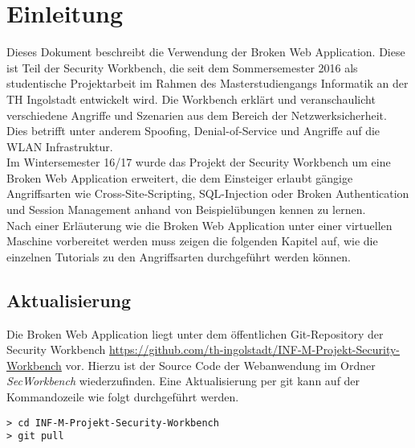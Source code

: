 \chapter{Einleitung}
Dieses Dokument beschreibt die Verwendung der Broken Web Application. Diese ist Teil der Security Workbench, die seit
dem Sommersemester 2016 als studentische Projektarbeit im Rahmen des Masterstudiengangs
Informatik an der TH Ingolstadt entwickelt wird. Die Workbench
erklärt und veranschaulicht verschiedene Angriffe und Szenarien aus dem Bereich
der Netzwerksicherheit. Dies betrifft unter anderem Spoofing, Denial-of-Service
und Angriffe auf die WLAN Infrastruktur. \\ 
Im Wintersemester 16/17 wurde das Projekt der Security Workbench um eine Broken Web Application erweitert, die dem Einsteiger erlaubt gängige Angriffsarten wie Cross-Site-Scripting, SQL-Injection oder Broken Authentication und Session Management anhand von Beispielübungen kennen zu lernen. \\ 
Nach einer Erläuterung wie die Broken Web Application unter einer virtuellen Maschine vorbereitet werden muss zeigen die folgenden Kapitel auf, wie die einzelnen Tutorials zu den Angriffsarten durchgeführt werden können. 

\section{Aktualisierung}

Die Broken Web Application liegt unter dem öffentlichen Git-Repository der Security Workbench \url{https://github.com/th-ingolstadt/INF-M-Projekt-Security-Workbench} vor. Hierzu ist der Source Code der Webanwendung im Ordner \textit{SecWorkbench} wiederzufinden. Eine Aktualisierung per git kann auf der Kommandozeile wie folgt durchgeführt werden.

\begin{lstlisting}
> cd INF-M-Projekt-Security-Workbench
> git pull
\end{lstlisting}



